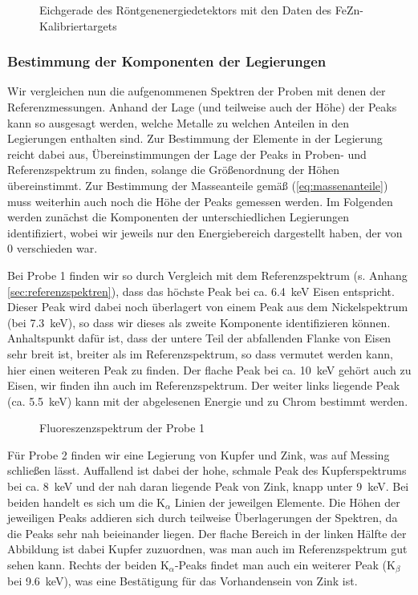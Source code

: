 \documentclass[11pt, a4paper]{article}
\begin{document}
\begin{figure}[h]
\centering
\resizebox{\columnwidth}{!}{%
}
\caption{Eichgerade des Röntgenenergiedetektors mit den Daten des FeZn-Kalibriertargets}
\label{fig:energieeichung}
\end{figure}

\subsubsection{Bestimmung der Komponenten der Legierungen}

Wir vergleichen nun die aufgenommenen Spektren der Proben mit denen der Referenzmessungen.
Anhand der Lage (und teilweise auch der Höhe) der Peaks kann so ausgesagt werden, welche Metalle zu welchen Anteilen in den Legierungen enthalten sind.
Zur Bestimmung der Elemente in der Legierung reicht dabei aus, Übereinstimmungen der Lage der Peaks in Proben- und Referenzspektrum zu finden, solange die Größenordnung der Höhen übereinstimmt.
Zur Bestimmung der Masseanteile gemäß (\ref{eq:massenanteile}) muss weiterhin auch noch die Höhe der Peaks gemessen werden.
Im Folgenden werden zunächst die Komponenten der unterschiedlichen Legierungen identifiziert, wobei wir jeweils nur den Energiebereich dargestellt haben, der von $0$ verschieden war.

Bei Probe 1 finden wir so durch Vergleich mit dem Referenzspektrum (s. Anhang \ref{sec:referenzspektren}), dass das höchste Peak bei ca. \SI{6.4}{\kilo\electronvolt} Eisen entspricht.
Dieser Peak wird dabei noch überlagert von einem Peak aus dem Nickelspektrum (bei \SI{7.3}{\kilo\electronvolt}), so dass wir dieses als zweite Komponente identifizieren können.
Anhaltspunkt dafür ist, dass der untere Teil der abfallenden Flanke von Eisen sehr breit ist, breiter als im Referenzspektrum, so dass vermutet werden kann, hier einen weiteren Peak zu finden.
Der flache Peak bei ca. \SI{10}{\kilo\electronvolt} gehört auch zu Eisen, wir finden ihn auch im Referenzspektrum.
Der weiter links liegende Peak (ca. \SI{5.5}{\kilo\electronvolt}) kann mit der abgelesenen Energie und \cite{booklet} zu Chrom bestimmt werden.

\begin{figure}[!h]
\centering

\caption{Fluoreszenzspektrum der Probe 1}
\label{fig:probe1}
\end{figure}

Für Probe 2 finden wir eine Legierung von Kupfer und Zink, was auf Messing schließen lässt.
Auffallend ist dabei der hohe, schmale Peak des Kupferspektrums bei ca. \SI{8}{\kilo\electronvolt} und der nah daran liegende Peak von Zink, knapp unter \SI{9}{\kilo\electronvolt}.
Bei beiden handelt es sich um die K$_{\alpha}$ Linien der jeweilgen Elemente.
Die Höhen der jeweiligen Peaks addieren sich durch teilweise Überlagerungen der Spektren, da die Peaks sehr nah beieinander liegen.
Der flache Bereich in der linken Hälfte der Abbildung ist dabei Kupfer zuzuordnen, was man auch im Referenzspektrum gut sehen kann.
Rechts der beiden K$_{\alpha}$-Peaks findet man auch ein weiterer Peak (K$_{\beta}$ bei \SI{9.6}{\kilo\electronvolt}), was eine Bestätigung für das Vorhandensein von Zink ist.
\end{document}
